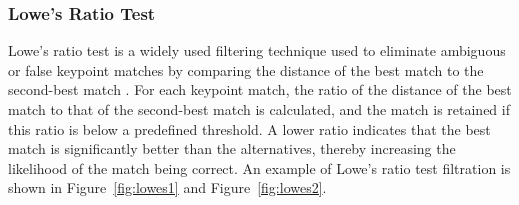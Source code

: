 \subsubsection{Lowe's Ratio Test}

Lowe's ratio test is a widely used filtering technique used to eliminate ambiguous or false keypoint matches by comparing the distance of the best match to the second-best match \cite{bian2020gms}. For each keypoint match, the ratio of the distance of the best match to that of the second-best match is calculated, and the match is retained if this ratio is below a predefined threshold. A lower ratio indicates that the best match is significantly better than the alternatives, thereby increasing the likelihood of the match being correct. An example of Lowe's ratio test filtration is shown in Figure~\ref{fig:lowes1} and Figure~\ref{fig:lowes2}.


